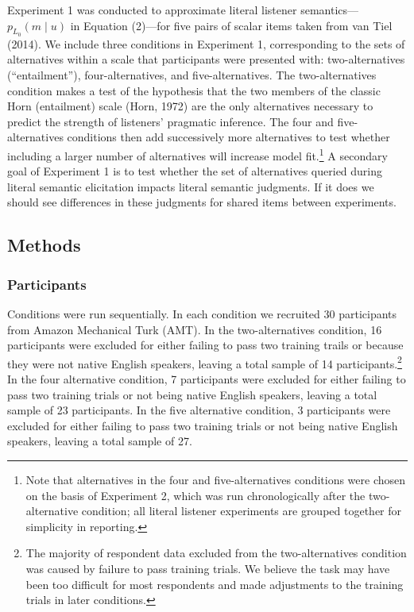 \documentclass[10pt, letterpaper]{article}
\begin{document}
Experiment 1 was conducted to approximate literal listener
semantics---\(p_{L_0}(m \mid u)\) in Equation (2)---for five pairs of
scalar items taken from {van Tiel} (2014). We include three conditions
in Experiment 1, corresponding to the sets of alternatives within a
scale that participants were presented with: two-alternatives
(``entailment''), four-alternatives, and five-alternatives. The
two-alternatives condition makes a test of the hypothesis that the two
members of the classic Horn (entailment) scale (Horn, 1972) are the only
alternatives necessary to predict the strength of listeners' pragmatic
inference. The four and five-alternatives conditions then add
successively more alternatives to test whether including a larger number
of alternatives will increase model
fit.\footnote{Note that alternatives in the four and five-alternatives conditions were chosen on the basis of Experiment 2, which was run chronologically after the two-alternative condition; all literal listener experiments are grouped together for simplicity in reporting.}
A secondary goal of Experiment 1 is to test whether the set of
alternatives queried during literal semantic elicitation impacts literal
semantic judgments. If it does we should see differences in these
judgments for shared items between experiments.

\subsection{Methods}\label{methods}

\subsubsection{Participants}\label{participants}

Conditions were run sequentially. In each condition we recruited 30
participants from Amazon Mechanical Turk (AMT). In the two-alternatives
condition, 16 participants were excluded for either failing to pass two
training trails or because they were not native English speakers,
leaving a total sample of 14
participants.\footnote{The majority of respondent data excluded from the two-alternatives condition was caused by failure to pass training trials. We believe the task may have been too difficult for most respondents and made adjustments to the training trials in later conditions.}
In the four alternative condition, 7 participants were excluded for
either failing to pass two training trials or not being native English
speakers, leaving a total sample of 23 participants. In the five
alternative condition, 3 participants were excluded for either failing
to pass two training trials or not being native English speakers,
leaving a total sample of 27.
\end{document}

